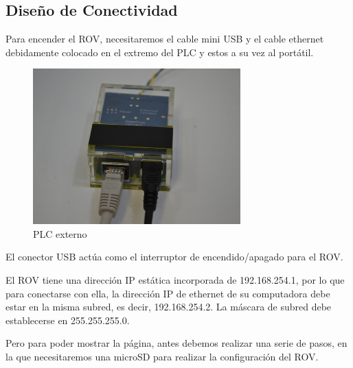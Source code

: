 \subsection{Diseño de Conectividad}
\label{subsec:disenio}

Para encender el ROV, necesitaremos el cable mini USB y el cable ethernet debidamente colocado en el extremo del PLC y estos a su vez al portátil.

\begin{figure} [hbtp]
\begin{center}
  \includegraphics[width=8cm]{img/cap3/3_4/plc_externo}
\end{center}
\caption{PLC externo}
\label{fig:plc_ext}
\end{figure}
  
El conector USB actúa como el interruptor de encendido/apagado para el ROV.

El ROV tiene una dirección IP estática incorporada de 192.168.254.1, por lo que para conectarse con ella, la dirección IP de ethernet de su computadora debe estar en la misma subred, es decir, 192.168.254.2. La máscara de subred debe establecerse en 255.255.255.0.

Pero para poder mostrar la página, antes debemos realizar una serie de pasos, en la que necesitaremos una microSD para realizar la configuración del ROV.
  
